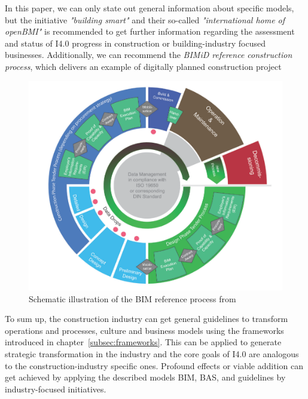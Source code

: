 In this paper, we can only state out general information about specific models, but the initiative \emph{"building smart"} \cite{buildingsmart:2016} %
and their so-called \emph{"international home of openBMI"} is recommended to get further information regarding the assessment and status of \ac{I4.0} progress in construction or building-industry focused businesses. Additionally, we can recommend the \emph{BIMiD reference construction process}, which delivers an example of digitally planned construction project \cite{bimidReferencemodel:2016} %

\begin{figure}[H]
\centering
\includegraphics[width=1\columnwidth]{images/construction-BIM-reference-process.PNG}
\caption{Schematic illustration of the BIM reference process from \citeauthor{FederalMinRoadMapConstruction} \cite{FederalMinRoadMapConstruction}}
\label{fig:BIMreference}
\end{figure}

To sum up, the construction industry can get general guidelines to transform operations and processes, culture and business models using the frameworks introduced in chapter~\ref{subsec:frameworks}. This can be applied to generate strategic transformation in the industry and the core goals of \ac{I4.0} are analogous to the construction-industry specific ones. Profound effects or viable addition can get achieved by applying the described models \ac{BIM}, \ac{BAS}, and guidelines by industry-focused initiatives.

